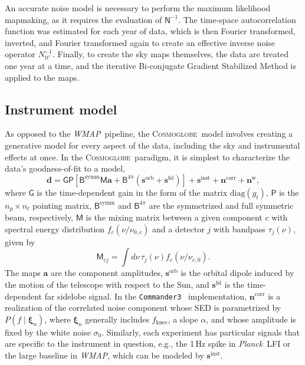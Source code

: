 \documentclass[twocolumn]{../../common/aa}
\def\WMAP{\emph{WMAP}}
\def\Planck{\emph{Planck}}
\def\commanderthree{\texttt{Commander3}}
\newcommand{\cosmoglobe}{\textsc{Cosmoglobe}}
\begin{document}
An accurate noise model is necessary to perform the maximum likelihood mapmaking, as it requires the evaluation of $\mathsf N^{-1}$. The time-space autocorrelation function was estimated for each year of data, which is then Fourier transformed, inverted, and Fourier transformed again to create an effective inverse noise operator $N_{tt'}^{-1}$. 
Finally, to create the sky maps themselves, the data are treated one year at a time, and the iterative Bi-conjugate Gradient Stabilized Method \citep[BiCG-STAB][]{bicgstab,bicgstab_template} is applied to the maps.


\subsection{Instrument model}
\label{sec:wmap_instmodel}

As opposed to the \WMAP\ pipeline, the \cosmoglobe\ model involves creating a generative model for every aspect of the data, including the sky and instrumental effects at once.
In the \cosmoglobe\ paradigm, it is simplest to characterize the data's goodness-of-fit to a model,
\begin{equation}
	\label{eq:model}
	\boldsymbol d =\mathsf G\mathsf P[\mathsf B^\mathrm{symm}\mathsf M\boldsymbol a+\mathsf B^\mathrm{4\pi}(\boldsymbol s^\mathrm{orb}
	+\boldsymbol s^\mathrm{fsl})] + \boldsymbol s^\mathrm{inst}+\boldsymbol n^\mathrm{corr}+\boldsymbol n^\mathrm w,
\end{equation}
where $\mathsf G$ is the time-dependent gain in the form of the matrix $\mathrm{diag}(g_t)$, $\mathsf P$ is the $n_p\times n_t$ pointing matrix, 
$\mathsf B^\mathrm{symm}$ and $\mathsf B^{4\pi}$ are the symmetrized and full symmetric beam, respectively, $\mathsf M$ is the mixing matrix between a given component $c$ with spectral energy distribution $f_c(\nu/\nu_{0,c})$ and a detector $j$ with bandpass $\tau_j(\nu)$, given by
\begin{equation}
	\mathsf M_{cj}=\int d\nu\,\tau_j(\nu)f_c(\nu/\nu_{c,0}).
\end{equation}
The maps $\boldsymbol a$ are the component amplitudes, $\boldsymbol s^\mathrm{orb}$ is the orbital dipole induced by the motion of the telescope with respect to the Sun, and $\boldsymbol s^\mathrm{fsl}$ is the time-dependent far sidelobe signal. In the \commanderthree\ \citep{bp03} implementation, $\boldsymbol n^\mathrm{corr}$ is a realization of the correlated noise component whose SED is parametrized by $P(f\mid\boldsymbol\xi_n)$, where $\boldsymbol\xi_n$ generally includes $f_\mathrm{knee}$, a slope $\alpha$, and whose amplitude is fixed by the white noise $\sigma_0$. 
Similarly, each experiment has particular signals that are specific to the instrument in question, e.g., the 1\,Hz spike in \Planck\ LFI or the large baseline in \WMAP, which can be modeled by $\boldsymbol s^\mathrm{inst}$.
\end{document}
